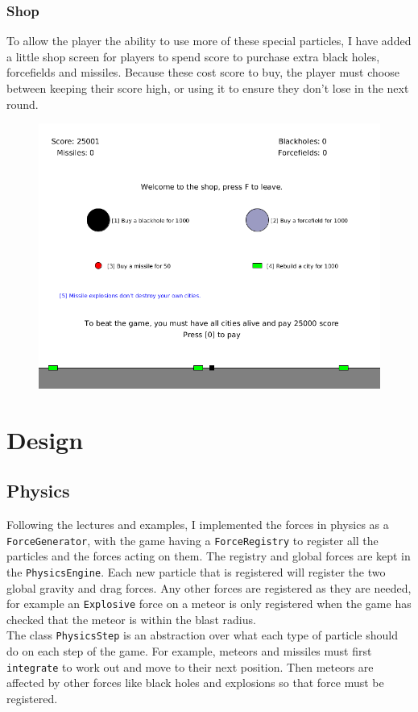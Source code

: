 \documentclass{article}
\newcommand{\n}[0]{\\[\baselineskip]}
\begin{document}
\subsubsection*{Shop}
To allow the player the ability to use more of these special particles, I have added a little shop screen for players to spend score to purchase extra black holes, forcefields and missiles. Because these cost score to buy, the player must choose between keeping their score high, or using it to ensure they don't lose in the next round. 
\begin{figure}[H]
\centering
\includegraphics[width=1\textwidth, keepaspectratio]{imgs/Shop.png}
\end{figure}


\section{Design}


\subsection{Physics}
Following the lectures and examples, I implemented the forces in physics as a \texttt{ForceGenerator}, with the game having a \texttt{ForceRegistry} to register all the particles and the forces acting on them. The registry and global forces are kept in the \texttt{PhysicsEngine}. Each new particle that is registered will register the two global gravity and drag forces. Any other forces are registered as they are needed, for example an \texttt{Explosive} force on a meteor is only registered when the game has checked that the meteor is within the blast radius. 
\n
The class \texttt{PhysicsStep} is an abstraction over what each type of particle should do on each step of the game. For example, meteors and missiles must first \texttt{integrate} to work out and move to their next position. Then meteors are affected by other forces like black holes and explosions so that force must be registered. 
\end{document}
